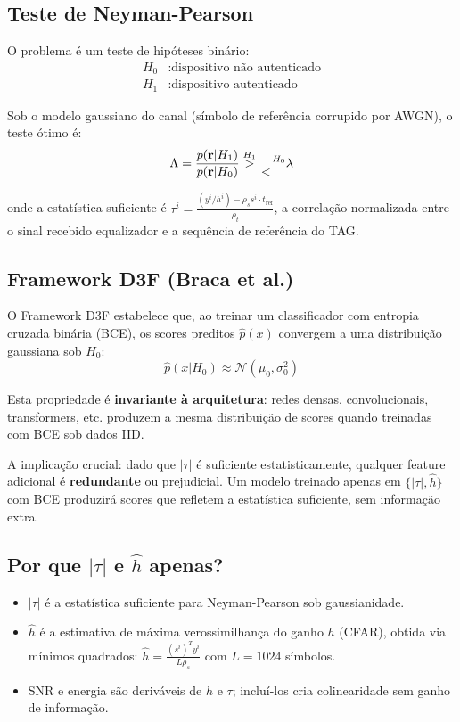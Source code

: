 \documentclass[10pt, a4paper]{article}
\begin{document}
\subsection{Teste de Neyman-Pearson}

O problema é um teste de hipóteses binário:
\begin{align}
H_0 &: \text{dispositivo não autenticado} \\
H_1 &: \text{dispositivo autenticado}
\end{align}

Sob o modelo gaussiano do canal (símbolo de referência corrupido por AWGN), o teste ótimo é:
$$\Lambda = \frac{p(\mathbf{r} | H_1)}{p(\mathbf{r} | H_0)} \stackrel{H_1}{>}{\atop <}^{H_0} \lambda$$

onde a estatística suficiente é $\tau^i = \frac{(y^i / h^i) - \rho_s s^i \cdot t_{\mathrm{ref}}}{\rho_t}$, a correlação normalizada entre o sinal recebido equalizador e a sequência de referência do TAG.

\subsection{Framework D3F (Braca et al.)}

O Framework D3F estabelece que, ao treinar um classificador com entropia cruzada binária (BCE), os scores preditos $\hat{p}(x)$ convergem a uma distribuição gaussiana sob $H_0$:
$$\hat{p}(x | H_0) \approx \mathcal{N}(\mu_0, \sigma_0^2)$$

Esta propriedade é \textbf{invariante à arquitetura}: redes densas, convolucionais, transformers, etc. produzem a mesma distribuição de scores quando treinadas com BCE sob dados IID.

A implicação crucial: dado que $|\tau|$ é suficiente estatisticamente, qualquer feature adicional é \textbf{redundante} ou prejudicial. Um modelo treinado apenas em $\{|\tau|, \hat{h}\}$ com BCE produzirá scores que refletem a estatística suficiente, sem informação extra.

\subsection{Por que $|\tau|$ e $\hat{h}$ apenas?}

\begin{itemize}
\item $|\tau|$ é a estatística suficiente para Neyman-Pearson sob gaussianidade.
\item $\hat{h}$ é a estimativa de máxima verossimilhança do ganho $h$ (CFAR), obtida via mínimos quadrados: $\hat{h} = \frac{(s^i)^T y^i}{L \rho_s}$ com $L = 1024$ símbolos.
\item SNR e energia são deriváveis de $h$ e $\tau$; incluí-los cria colinearidade sem ganho de informação.
\end{itemize}
\end{document}
